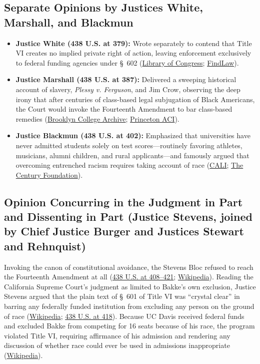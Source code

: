 \documentclass[12pt]{article}
\begin{document}
\subsection{Separate Opinions by Justices White, Marshall, and Blackmun}
\begin{itemize}
\item \textbf{Justice White (438 U.S. at 379):} Wrote separately to contend that Title VI creates no implied private right of action, leaving enforcement exclusively to federal funding agencies under \S~602 (\href{https://tile.loc.gov/storage-services/service/ll/usrep/usrep438/usrep438265/usrep438265.pdf}{Library of Congress}; \href{https://caselaw.findlaw.com/court/us-supreme-court/438/265.html}{FindLaw}).
\item \textbf{Justice Marshall (438 U.S. at 387):} Delivered a sweeping historical account of slavery, \textit{Plessy v. Ferguson}, and Jim Crow, observing the deep irony that after centuries of class-based legal subjugation of Black Americans, the Court would invoke the Fourteenth Amendment to bar class-based remedies (\href{http://academic.brooklyn.cuny.edu/history/johnson/bakke.htm}{Brooklyn College Archive}; \href{https://aci.princeton.edu/document/65}{Princeton ACI}).
\item \textbf{Justice Blackmun (438 U.S. at 402):} Emphasized that universities have never admitted students solely on test scores---routinely favoring athletes, musicians, alumni children, and rural applicants---and famously argued that overcoming entrenched racism requires taking account of race (\href{https://liberty.lawbooks.cali.org/chapter/race-and-equal-protection-part-2/}{CALI}; \href{https://tcf.org/content/report/achieving-better-diversity/}{The Century Foundation}).
\end{itemize}

\subsection{Opinion Concurring in the Judgment in Part and Dissenting in Part (Justice Stevens, joined by Chief Justice Burger and Justices Stewart and Rehnquist)}
Invoking the canon of constitutional avoidance, the Stevens Bloc refused to reach the Fourteenth Amendment at all (\href{https://supreme.justia.com/cases/federal/us/438/265/}{438 U.S. at 408--421}; \href{https://en.wikipedia.org/wiki/Regents_of_the_University_of_California_v._Bakke}{Wikipedia}). Reading the California Supreme Court's judgment as limited to Bakke's own exclusion, Justice Stevens argued that the plain text of \S~601 of Title VI was ``crystal clear'' in barring any federally funded institution from excluding any person on the ground of race (\href{https://en.wikipedia.org/wiki/Regents_of_the_University_of_California_v._Bakke}{Wikipedia}; \href{https://supreme.justia.com/cases/federal/us/438/265/}{438 U.S. at 418}). Because UC Davis received federal funds and excluded Bakke from competing for 16 seats because of his race, the program violated Title VI, requiring affirmance of his admission and rendering any discussion of whether race could ever be used in admissions inappropriate (\href{https://en.wikipedia.org/wiki/Regents_of_the_University_of_California_v._Bakke}{Wikipedia}).
\end{document}
